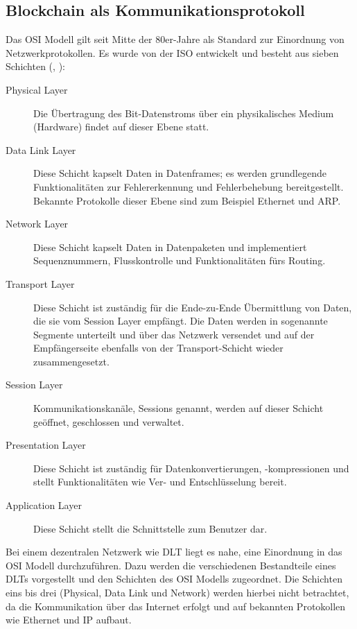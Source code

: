 \subsection{Blockchain als Kommunikationsprotokoll}
\label{subsec:fundamentals:dlt:protocol}
Das \ac{OSI} Modell gilt seit Mitte der 80er-Jahre als Standard zur Einordnung von Netzwerkprotokollen. Es wurde von der \ac{ISO} entwickelt und besteht aus sieben Schichten (\cite{OSI1980}, \cite{osi2014}):
\begin{description}
  \item[Physical Layer] Die Übertragung des Bit-Datenstroms über ein physikalisches Medium (Hardware) findet auf dieser Ebene statt.
  \item[Data Link Layer] Diese Schicht kapselt Daten in Datenframes; es werden grundlegende Funktionalitäten zur Fehlererkennung und Fehlerbehebung bereitgestellt. Bekannte Protokolle dieser Ebene sind zum Beispiel Ethernet und \ac{ARP}.
  \item[Network Layer] Diese Schicht kapselt Daten in Datenpaketen und implementiert Sequenznummern, Flusskontrolle und Funktionalitäten fürs Routing.
  \item[Transport Layer] Diese Schicht ist zuständig für die Ende-zu-Ende Übermittlung von Daten, die sie vom Session Layer empfängt. Die Daten werden in sogenannte Segmente unterteilt und über das Netzwerk versendet und auf der Empfängerseite ebenfalls von der Transport-Schicht wieder zusammengesetzt.
  \item[Session Layer] Kommunikationskanäle, Sessions genannt, werden auf dieser Schicht geöffnet, geschlossen und verwaltet.
  \item[Presentation Layer] Diese Schicht ist zuständig für Datenkonvertierungen, -kompressionen und stellt Funktionalitäten wie Ver- und Entschlüsselung bereit.
  \item[Application Layer] Diese Schicht stellt die Schnittstelle zum Benutzer dar.
\end{description}

Bei einem dezentralen Netzwerk wie \ac{DLT} liegt es nahe, eine Einordnung in das \ac{OSI} Modell durchzuführen. Dazu werden die verschiedenen Bestandteile eines \acp{DLT} vorgestellt und den Schichten des \ac{OSI} Modells zugeordnet. Die Schichten eins bis drei (Physical, Data Link und Network) werden hierbei nicht betrachtet, da die Kommunikation über das Internet erfolgt und auf bekannten Protokollen wie Ethernet und IP aufbaut.

